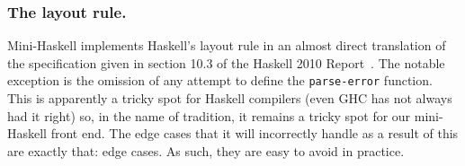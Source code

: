 \documentclass{llncs}
\begin{document}
\subsubsection{The layout rule.}
Mini-Haskell implements Haskell's layout rule in an almost direct translation
of the specification given in section 10.3 of the Haskell 2010
Report~\cite{haskell2010report}. The notable exception is the omission of any
attempt to define the \texttt{parse-error} function.  This is apparently a
tricky spot for Haskell compilers (even GHC has not always had it right) so,
in the name of tradition, it remains a tricky spot for our mini-Haskell front
end.  The edge cases that it will incorrectly handle as a result of this are
exactly that: edge cases.  As such, they are easy to avoid in practice.
\begin{comment} 
The inclusion of the layout rule may seem insignificant, but it
allows users to produce code that is visually similar to Haskell code.
This makes it easier to read and write for any Haskell programmer who relies
on layout to delineate context, presumably the vast majority.  It also allows
for the use of Haskell programming environments that support ``smart''
indentation, e.g., \emph{haskell-mode} for Emacs~\cite{haskellmode}.
\end{comment}




\vspace{-0.1in}
\end{document}
